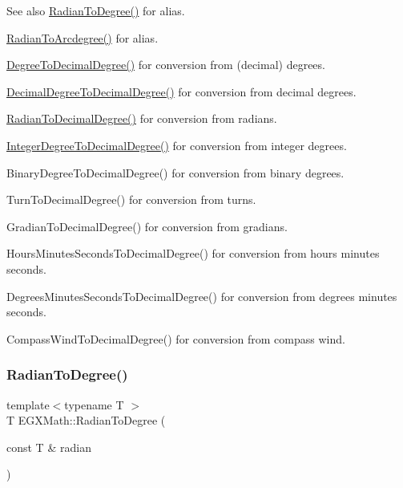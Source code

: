 \begin{DoxySeeAlso}{See also}
\mbox{\hyperlink{group___e_g_x_math-_angle_conversions-_radian_ga25bbce6cdc1c3621f2a158d320e3bc45}{Radian\+To\+Degree()}} for alias. 

\mbox{\hyperlink{group___e_g_x_math-_angle_conversions-_radian_ga3dfdc97357cc07f8379976bbc08f9852}{Radian\+To\+Arcdegree()}} for alias. 

\mbox{\hyperlink{group___e_g_x_math-_angle_conversions-_degree_ga568afc1d436d425bf5d4edea584aee08}{Degree\+To\+Decimal\+Degree()}} for conversion from (decimal) degrees. 

\mbox{\hyperlink{group___e_g_x_math-_angle_conversions-_decimal_degree_gafccf9cd779903872887978ab9d79661f}{Decimal\+Degree\+To\+Decimal\+Degree()}} for conversion from decimal degrees. 

\mbox{\hyperlink{group___e_g_x_math-_angle_conversions-_radian_ga6d170f1882c32de53167c04524d05f67}{Radian\+To\+Decimal\+Degree()}} for conversion from radians. 

\mbox{\hyperlink{group___e_g_x_math-_angle_conversions-_integer_degree_gac219c3198508ba984d8d81d22831b27d}{Integer\+Degree\+To\+Decimal\+Degree()}} for conversion from integer degrees. 

Binary\+Degree\+To\+Decimal\+Degree() for conversion from binary degrees. 

Turn\+To\+Decimal\+Degree() for conversion from turns. 

Gradian\+To\+Decimal\+Degree() for conversion from gradians. 

Hours\+Minutes\+Seconds\+To\+Decimal\+Degree() for conversion from hours minutes seconds. 

Degrees\+Minutes\+Seconds\+To\+Decimal\+Degree() for conversion from degrees minutes seconds. 

Compass\+Wind\+To\+Decimal\+Degree() for conversion from compass wind. 
\end{DoxySeeAlso}
\mbox{\label{group___e_g_x_math-_angle_conversions-_radian_ga25bbce6cdc1c3621f2a158d320e3bc45}} 
\subsubsection{\texorpdfstring{Radian\+To\+Degree()}{RadianToDegree()}}
{\footnotesize\ttfamily template$<$typename T $>$ \\
T E\+G\+X\+Math\+::\+Radian\+To\+Degree (\begin{DoxyParamCaption}\item[{const T \&}]{radian }\end{DoxyParamCaption})}




